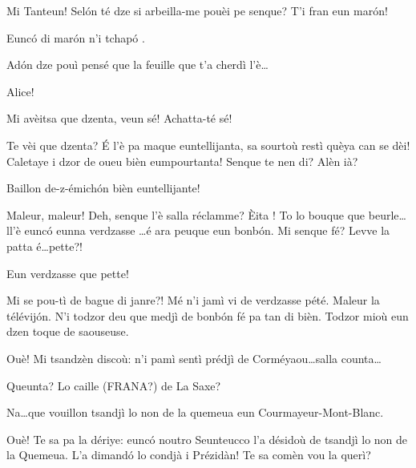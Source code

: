 \begin{drama}
\Sperancespeaks Mi Tanteun! Sel\'on té dze si arbeilla-me pouèi pe senque? T'i fran eun mar\'on! 


\Tanteunspeaks{} Eunc\'o di mar\'on n'i tchap\'o .

\Mariespeaks Ad\'on dze pouì pensé que la feuille que t'a cherdì l'è\ldots

\Tanteunspeaks{} Alice!


\Tanteunspeaks Mi avèitsa que dzenta, veun sé! Achatta-té sé!


\Tanteunspeaks{} Te vèi que dzenta? \'E l'è pa maque euntellijanta, sa sourtoù restì quèya can se dèi! Caletaye i dzor de oueu bièn eumpourtanta! Senque te nen di? Alèn ià?





\Vioujspeaks Baillon de-z-émich\'on bièn euntellijante!

\Vioupspeaks Maleur, maleur! Deh, senque l'è salla réclamme? \`Eita ! To lo bouque que beurle\ldots ll'è eunc\'o eunna verdzasse \ldots é ara peuque eun bonb\'on. Mi senque fé? Levve la patta é\ldots pette?! 


\Vioujspeaks Eun verdzasse que pette!

\Vioupspeaks Mi se pou-tì de bague di janre?! Mé n'i jamì vi de verdzasse pété. Maleur la télévij\'on. N'i todzor deu que medjì de bonb\'on fé pa tan di bièn. Todzor mioù eun dzen toque de saouseuse.

\Vioujspeaks Ouè! Mi tsandzèn discoù:  n'i pamì sentì prédjì de Corméyaou\ldots salla counta\ldots

\Vioupspeaks Queunta? Lo caille (FRANA?) de La Saxe?

\Vioujspeaks Na\ldots que vouillon tsandjì lo non de la quemeua eun  Courmayeur-Mont-Blanc.

\Vioupspeaks Ouè! Te sa pa la dériye: eunc\'o noutro Seunteucco l'a désidoù de tsandjì lo non de la Quemeua. L'a dimand\'o lo condjà i Prézidàn! Te sa comèn vou la querì?


\end{drama}
